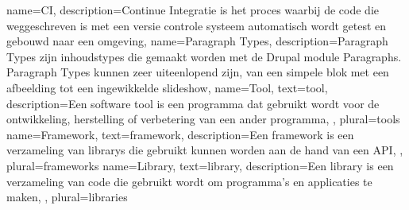 
%
%

%


{
    name={CI},
    description={Continue Integratie is het proces waarbij de code die weggeschreven is met een versie controle systeem automatisch wordt getest en gebouwd naar een omgeving, \textcite{Guckenheimer2017}}
}
{
    name=Paragraph Types,
    description={Paragraph Types zijn inhoudstypes die gemaakt worden met de Drupal module Paragraphs. Paragraph Types kunnen zeer uiteenlopend zijn, van een simpele blok met een afbeelding tot een ingewikkelde slideshow, \textcite{Bobbeldijk2013}}
}
{
    name=Tool,
    text={tool},
    description={Een software tool is een programma dat gebruikt wordt voor de ontwikkeling, herstelling of verbetering van een ander programma, \textcite{Tool2004}},
    plural={tools}
}
{
    name=Framework,
    text={framework},
    description={Een framework is een verzameling van \glspl{library} die gebruikt kunnen worden aan de hand van een \gls{API}, \textcite{Framework}},
    plural={frameworks}
}
{
    name=Library,
    text={library},
    description={Een library is een verzameling van code die gebruikt wordt om programma's en applicaties te maken, \textcite{Library}},
    plural={libraries}
}

